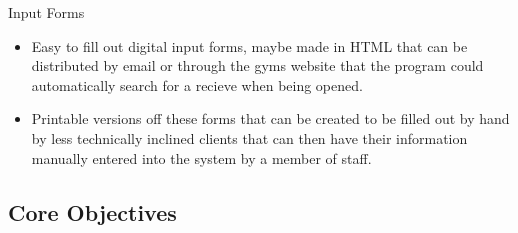 Input Forms

    \begin{itemize}  

        \item Easy to fill out digital input forms, maybe made in HTML that can be distributed by email or through the gyms website that the program could automatically search for a recieve when being opened.
        \item Printable versions off these forms that can be created to be filled out by hand by less technically inclined clients that can then have their information manually entered into the system by a member of staff.

    \end{itemize}

\subsection{Core Objectives}


